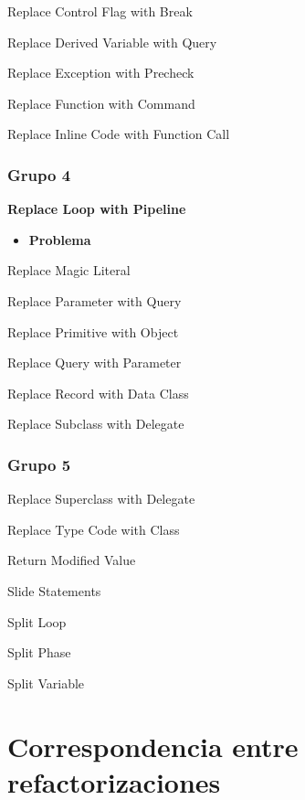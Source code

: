 \documentclass[11pt,a4paper,oneside]{book}
\begin{document}
Replace Control Flag with Break

Replace Derived Variable with Query

Replace Exception with Precheck

Replace Function with Command

Replace Inline Code with Function Call

\subsection{Grupo 4}
\textbf{Replace Loop with Pipeline}
\label{ReplaceLoopWithPipeline}
\begin{itemize}
    \item \textbf{Problema}
    
\end{itemize}


Replace Magic Literal

Replace Parameter with Query

Replace Primitive with Object

Replace Query with Parameter

Replace Record with Data Class

Replace Subclass with Delegate

\subsection{Grupo 5}
Replace Superclass with Delegate

Replace Type Code with Class

Return Modified Value

Slide Statements

Split Loop

Split Phase

Split Variable



\chapter*{Correspondencia entre refactorizaciones}
\end{document}
